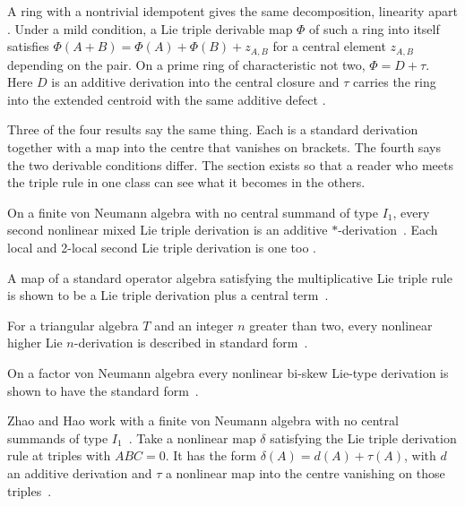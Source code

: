 A ring with a nontrivial idempotent gives the same decomposition, linearity
apart \cite[Abstract]{LiFangLuWang2014LieTripleDerivable}. Under a mild
condition, a Lie triple derivable map $\Phi$ of such a ring into itself
satisfies $\Phi(A+B)=\Phi(A)+\Phi(B)+z_{A,B}$ for a central element $z_{A,B}$
depending on the pair. On a prime ring of characteristic not two, $\Phi = D +
\tau$. Here $D$ is an additive derivation into the central closure and $\tau$
carries the ring into the extended centroid with the same additive defect
\cite[Abstract]{LiFangLuWang2014LieTripleDerivable}.

Three of the four results say the same thing. Each is a standard derivation
together with a map into the centre that vanishes on brackets.
The fourth says the two derivable conditions differ.
The section exists so that a reader who meets the triple rule in one class can
see what it becomes in the others.

On a finite von Neumann algebra with no central summand of type $I_1$, every
second nonlinear mixed Lie triple derivation is an additive $*$-derivation~\cite[Abstract]{SecondNonlinearMixedLieTriple2020}.
Each local and 2-local second Lie triple derivation is one too
\cite[Abstract]{SecondNonlinearMixedLieTriple2020}.

A map of a standard operator algebra satisfying the multiplicative Lie triple
rule is shown to be a Lie triple derivation plus a central
term~\cite{WlMultiplicativeLieTriple2018}.

For a triangular algebra $T$ and an integer $n$ greater than two, every
nonlinear higher Lie $n$-derivation is described in standard
form~\cite{WlTriangularAlgebrasWithNonlinea2021}.

On a factor von Neumann algebra every nonlinear bi-skew Lie-type derivation is
shown to have the standard form~\cite{WlNonlinearBiSkewLieTypeDerivati2020}.

Zhao and Hao work with a finite von Neumann algebra with no central summands
of type $I_1$~\cite{WlNonGlobalNonlinearLieTripleDer2021}. Take a nonlinear map $\delta$ satisfying the Lie triple
derivation rule at triples with $ABC=0$. It has the form
$\delta(A)=d(A)+\tau(A)$,
with $d$ an additive derivation and $\tau$ a nonlinear map into the centre
vanishing on those triples~\cite{WlNonGlobalNonlinearLieTripleDer2021}.

